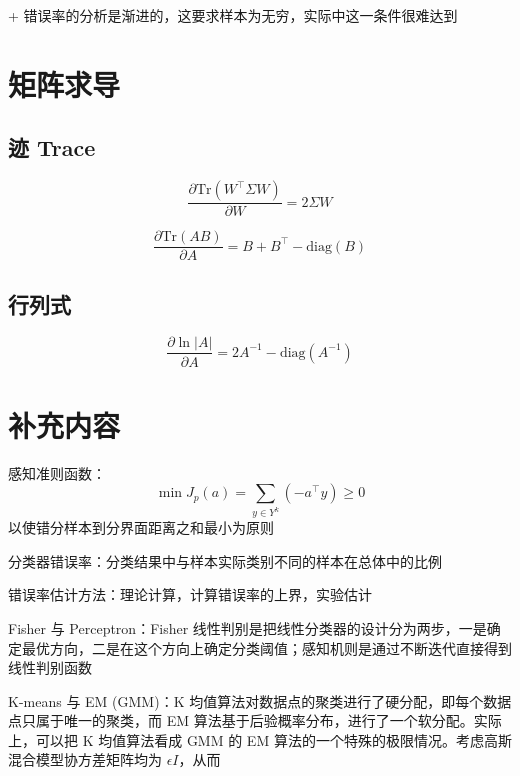 \documentclass[openany,a4paper,12pt]{ctexbook}
\theoremstyle{kaiti}
\theoremstyle{normal}
\begin{document}
+ 错误率的分析是渐进的，这要求样本为无穷，实际中这一条件很难达到

\chapter{矩阵求导}

\section{迹 Trace}

\begin{equation}
\frac{\partial \mathrm{Tr}\left(W^{\top}\Sigma W \right)}{\partial W}=2\Sigma W
\end{equation}

\begin{equation}
\frac{\partial \mathrm{Tr}\left(AB \right)}{\partial A}=B+B^{\top}-\mathrm{diag}\left(B \right)
\end{equation}

\section{行列式}

\begin{equation}
\frac{\partial \ln |A|}{\partial A}=2A^{-1}-\mathrm{diag}\left(A^{-1} \right)
\end{equation}

\chapter{补充内容}

感知准则函数：
  \begin{equation}
  \min J_p\left(a \right)=\sum_{y\in Y^k}\left(-a^{\top}y \right)\geqslant 0
  \end{equation}
  以使错分样本到分界面距离之和最小为原则

分类器错误率：分类结果中与样本实际类别不同的样本在总体中的比例

错误率估计方法：理论计算，计算错误率的上界，实验估计

Fisher 与 Perceptron：Fisher 线性判别是把线性分类器的设计分为两步，一是确定最优方向，二是在这个方向上确定分类阈值；感知机则是通过不断迭代直接得到线性判别函数

K-means 与 EM (GMM)：K 均值算法对数据点的聚类进行了硬分配，即每个数据点只属于唯一的聚类，而 EM 算法基于后验概率分布，进行了一个软分配。实际上，可以把 K 均值算法看成 GMM 的 EM 算法的一个特殊的极限情况。考虑高斯混合模型协方差矩阵均为 $\epsilon I$，从而
\end{document}
